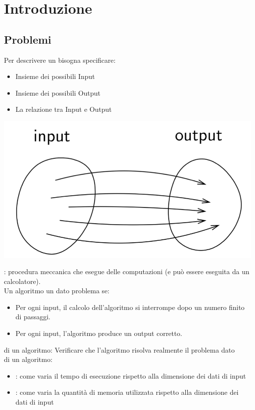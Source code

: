 \section{Introduzione}
\subsection{Problemi}
Per descrivere un  bisogna specificare:
\begin{itemize}
	\item  Insieme dei possibili Input
	\item  Insieme dei possibili Output
	\item  La relazione tra Input e Output
\end{itemize}
\includegraphics[scale=0.5]{img/funzione.png}

\nin{}: procedura meccanica che esegue delle computazioni (e può essere eseguita da un calcolatore).\\
Un algoritmo  un dato problema se:
\begin{itemize}
	\item Per ogni input, il calcolo dell'algoritmo si interrompe dopo un numero finito di passaggi.
	\item Per ogni input, l'algoritmo produce un output corretto.
\end{itemize}
 di un algoritmo:
Verificare che l'algoritmo risolva realmente il problema dato\\
 di un algoritmo:
\begin{itemize}
	\item  {}: come varia il tempo di esecuzione rispetto alla dimensione dei dati di input
	\item  {}: come varia la quantità di memoria utilizzata rispetto alla dimensione dei dati di input
\end{itemize}
